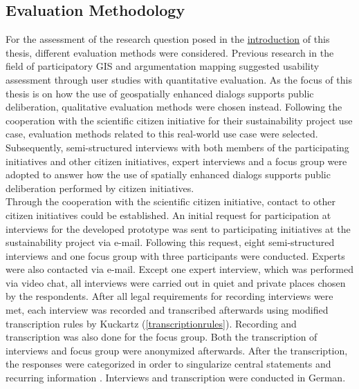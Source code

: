 \subsection{Evaluation Methodology}
\label{subchap:ev_methodology}
For the assessment of the research question posed in the \hyperref[chap:introduction]{introduction} of this thesis, different evaluation methods were considered. Previous research in the field of participatory GIS and argumentation mapping suggested usability assessment through user studies with quantitative evaluation. As the focus of this thesis is on how the use of geospatially enhanced dialogs supports public deliberation, qualitative evaluation methods were chosen instead. Following the cooperation with the scientific citizen initiative for their sustainability project use case, evaluation methods related to this real-world use case were selected. Subsequently, semi-structured interviews with both members of the participating initiatives and other citizen initiatives, expert interviews and a focus group were adopted to answer how the use of spatially enhanced dialogs supports public deliberation performed by citizen initiatives.\\
Through the cooperation with the scientific citizen initiative, contact to other citizen initiatives could be established. An initial request for participation at interviews for the developed prototype was sent to participating initiatives at the sustainability project via e-mail. Following this request, eight semi-structured interviews and one focus group with three participants were conducted. Experts were also contacted via e-mail. Except one expert interview, which was performed via video chat, all interviews were carried out in quiet and private places chosen by the respondents. After all legal requirements for recording interviews were met, each interview was recorded and transcribed afterwards using modified transcription rules by Kuckartz \cite{kuckartz2007} (\ref{transcriptionrules}). Recording and transcription was also done for the focus group. Both the transcription of interviews and focus group were anonymized afterwards. After the transcription, the responses were categorized in order to singularize central statements and recurring information \cite{naderer2007auswertung}. Interviews and transcription were conducted in German.


